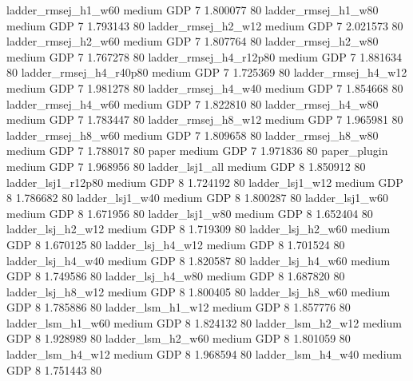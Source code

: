    ladder_rmsej_h1_w60     medium      GDP                 7 1.800077 80
   ladder_rmsej_h1_w80     medium      GDP                 7 1.793143 80
   ladder_rmsej_h2_w12     medium      GDP                 7 2.021573 80
   ladder_rmsej_h2_w60     medium      GDP                 7 1.807764 80
   ladder_rmsej_h2_w80     medium      GDP                 7 1.767278 80
ladder_rmsej_h4_r12p80     medium      GDP                 7 1.881634 80
ladder_rmsej_h4_r40p80     medium      GDP                 7 1.725369 80
   ladder_rmsej_h4_w12     medium      GDP                 7 1.981278 80
   ladder_rmsej_h4_w40     medium      GDP                 7 1.854668 80
   ladder_rmsej_h4_w60     medium      GDP                 7 1.822810 80
   ladder_rmsej_h4_w80     medium      GDP                 7 1.783447 80
   ladder_rmsej_h8_w12     medium      GDP                 7 1.965981 80
   ladder_rmsej_h8_w60     medium      GDP                 7 1.809658 80
   ladder_rmsej_h8_w80     medium      GDP                 7 1.788017 80
                 paper     medium      GDP                 7 1.971836 80
          paper_plugin     medium      GDP                 7 1.968956 80
       ladder_lsj1_all     medium      GDP                 8 1.850912 80
    ladder_lsj1_r12p80     medium      GDP                 8 1.724192 80
       ladder_lsj1_w12     medium      GDP                 8 1.786682 80
       ladder_lsj1_w40     medium      GDP                 8 1.800287 80
       ladder_lsj1_w60     medium      GDP                 8 1.671956 80
       ladder_lsj1_w80     medium      GDP                 8 1.652404 80
     ladder_lsj_h2_w12     medium      GDP                 8 1.719309 80
     ladder_lsj_h2_w60     medium      GDP                 8 1.670125 80
     ladder_lsj_h4_w12     medium      GDP                 8 1.701524 80
     ladder_lsj_h4_w40     medium      GDP                 8 1.820587 80
     ladder_lsj_h4_w60     medium      GDP                 8 1.749586 80
     ladder_lsj_h4_w80     medium      GDP                 8 1.687820 80
     ladder_lsj_h8_w12     medium      GDP                 8 1.800405 80
     ladder_lsj_h8_w60     medium      GDP                 8 1.785886 80
     ladder_lsm_h1_w12     medium      GDP                 8 1.857776 80
     ladder_lsm_h1_w60     medium      GDP                 8 1.824132 80
     ladder_lsm_h2_w12     medium      GDP                 8 1.928989 80
     ladder_lsm_h2_w60     medium      GDP                 8 1.801059 80
     ladder_lsm_h4_w12     medium      GDP                 8 1.968594 80
     ladder_lsm_h4_w40     medium      GDP                 8 1.751443 80
